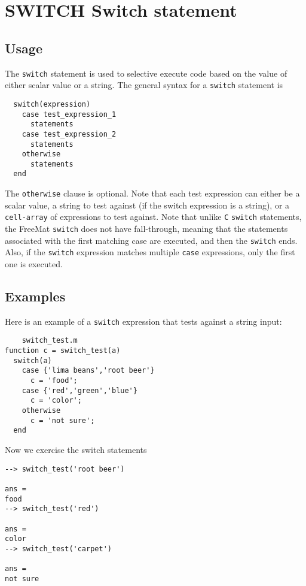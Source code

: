 \section{SWITCH Switch statement}

\subsection{Usage}

The \verb|switch| statement is used to selective execute code
based on the value of either scalar value or a string.
The general syntax for a \verb|switch| statement is
\begin{verbatim}
  switch(expression)
    case test_expression_1
      statements
    case test_expression_2
      statements
    otherwise
      statements
  end
\end{verbatim}
The \verb|otherwise| clause is optional.  Note that each test
expression can either be a scalar value, a string to test
against (if the switch expression is a string), or a 
\verb|cell-array| of expressions to test against.  Note that
unlike \verb|C| \verb|switch| statements, the FreeMat \verb|switch|
does not have fall-through, meaning that the statements
associated with the first matching case are executed, and
then the \verb|switch| ends.  Also, if the \verb|switch| expression
matches multiple \verb|case| expressions, only the first one
is executed.
\subsection{Examples}

Here is an example of a \verb|switch| expression that tests
against a string input:
\begin{verbatim}
    switch_test.m
function c = switch_test(a)
  switch(a)
    case {'lima beans','root beer'}
      c = 'food';
    case {'red','green','blue'}
      c = 'color';
    otherwise
      c = 'not sure';
  end
\end{verbatim}
Now we exercise the switch statements
\begin{verbatim}
--> switch_test('root beer')

ans = 
food
--> switch_test('red')

ans = 
color
--> switch_test('carpet')

ans = 
not sure
\end{verbatim}

